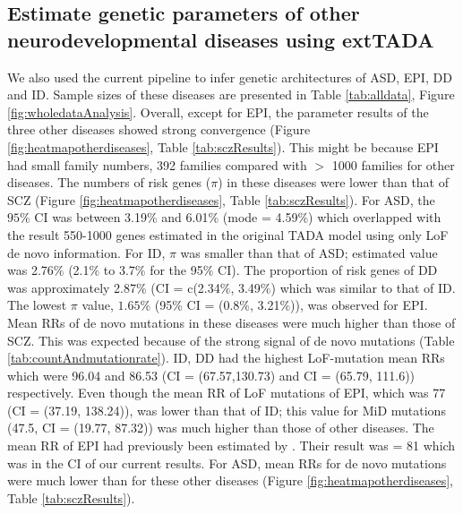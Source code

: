 \documentclass[]{article}
\begin{document}
\subsection{Estimate genetic parameters of other neurodevelopmental diseases using extTADA}

We also used the current pipeline to infer genetic architectures of
ASD, EPI, DD and ID. Sample sizes of these diseases are presented in
Table \ref{tab:alldata}, Figure \ref{fig:wholedataAnalysis}. Overall, except for EPI, the parameter results of the three other
diseases showed strong convergence (Figure
\ref{fig:heatmapotherdiseases}, Table \ref{tab:sczResults}). This
might be because EPI had small family numbers, 392 families compared with $>$
1000 families for other diseases.
The numbers of risk genes ($\pi$) in these diseases were lower
than that of SCZ (Figure \ref{fig:heatmapotherdiseases}, Table \ref{tab:sczResults}).
For ASD, the $95\%$ CI was between
3.19$\%$ and 6.01$\%$ (mode = 4.59$\%$) which overlapped with the result 550-1000 genes estimated in
the original TADA model \citep{he2013integrated} using only LoF de
novo information. For ID, $\pi$ was
smaller than that of ASD; estimated value was 2.76$\%$ (2.1$\%$ to
3.7$\%$ for the 95$\%$ CI). The proportion of risk genes of DD was approximately 2.87$\%$ (CI = c(2.34$\%$, 3.49$\%$) which was similar to that of ID.
The lowest $\pi$ value, $1.65\%$ (95$\%$ CI
= (0.8$\%$, 3.21$\%$)), was observed for EPI. Mean RRs of de
novo mutations in these diseases were much higher than those of
SCZ. This was expected because of the strong signal of de novo mutations
(Table \ref{tab:countAndmutationrate}).
ID, DD had the highest LoF-mutation mean RRs which were 96.04 and
86.53 (CI = (67.57,130.73) and CI = (65.79, 111.6)) respectively. Even though the mean RR of LoF mutations of EPI, which was
77 (CI = (37.19, 138.24)),  was lower
than that of ID; this value for MiD mutations (47.5, CI = (19.77,
87.32)) was much higher than those of other diseases. The mean RR of
EPI had previously been estimated by \cite{phenome2013novo}. Their
result was = 81 which was in the CI of our current results.
For ASD, mean RRs for
de novo mutations were much lower than for these other diseases (Figure
\ref{fig:heatmapotherdiseases}, Table \ref{tab:sczResults}).
\end{document}
